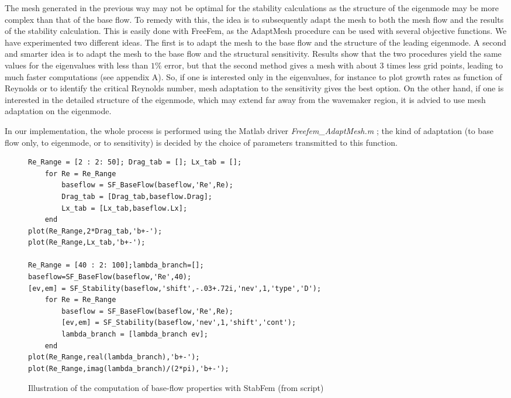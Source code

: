 \documentclass[twocolumn,10pt]{asme2ej}
\begin{document}
The mesh generated in the previous way may not be optimal for the stability calculations as the structure of the eigenmode may be more complex than that of the base flow. To remedy with this, the idea is to subsequently adapt the mesh to both the mesh flow and the results of the stability calculation. This is easily done with FreeFem, as the  AdaptMesh procedure can be used with several objective functions. We have experimented two different ideas. The first is to adapt the mesh to the base flow and the structure of the leading eigenmode. A second and smarter idea is to adapt the mesh to the base flow and the structural sensitivity. Results show that the two procedures yield the same values for the eigenvalues with less than $1\percent$ error, but that the second method gives a mesh with about 3 times less grid points, leading to much faster computations (see appendix A). So, if one is interested only in the eigenvalues, for instance to plot growth rates as function of Reynolds or to identify the critical Reynolds number, mesh adaptation to the sensitivity gives the best option. On the other hand, if one is interested in the detailed structure of the eigenmode, which may extend far away from the wavemaker region, it is advied to use mesh adaptation on the eigenmode. 

In our implementation, the whole process is performed using the Matlab driver {\em Freefem\_AdaptMesh.m} ; the kind of adaptation 
(to base flow only, to eigenmode, or to sensitivity) is decided by the choice of parameters transmitted to this function.




\begin{figure*}[t]
\small
\begin{lstlisting}
Re_Range = [2 : 2: 50]; Drag_tab = []; Lx_tab = [];
    for Re = Re_Range
        baseflow = SF_BaseFlow(baseflow,'Re',Re);
        Drag_tab = [Drag_tab,baseflow.Drag];
        Lx_tab = [Lx_tab,baseflow.Lx];
    end
plot(Re_Range,2*Drag_tab,'b+-');
plot(Re_Range,Lx_tab,'b+-');

Re_Range = [40 : 2: 100];lambda_branch=[];
baseflow=SF_BaseFlow(baseflow,'Re',40);
[ev,em] = SF_Stability(baseflow,'shift',-.03+.72i,'nev',1,'type','D');
    for Re = Re_Range
        baseflow = SF_BaseFlow(baseflow,'Re',Re);
        [ev,em] = SF_Stability(baseflow,'nev',1,'shift','cont');
        lambda_branch = [lambda_branch ev];
    end
plot(Re_Range,real(lambda_branch),'b+-');
plot(Re_Range,imag(lambda_branch)/(2*pi),'b+-');
\end{lstlisting}
\normalsize
\caption{Illustration of the computation of base-flow properties with StabFem (from script)}
\label{Listing2}
\end{figure*}
\end{document}

